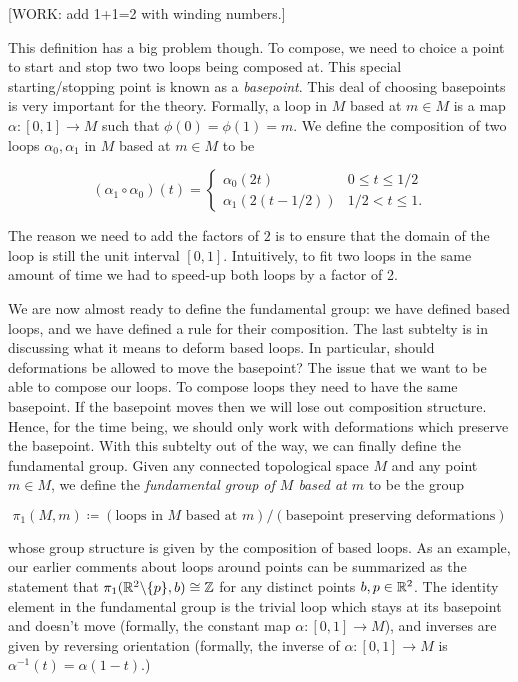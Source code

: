 [WORK: add 1+1=2 with winding numbers.]

This definition has a big problem though. To compose, we need to choice a point to start and stop two two loops being composed at. This special starting/stopping point is known as a \textit{basepoint}. This deal of choosing basepoints is very important for the theory. Formally, a loop in $M$ based at $m\in M$ is a map $\alpha:[0,1]\to M$ such that $\phi(0)=\phi(1)=m$. We define the composition of two loops $\alpha_0,\alpha_1$ in $M$ based at $m\in M$ to be

$$
(\alpha_1 \circ \alpha_0)(t)=
\begin{cases}
\alpha_0(2t) & 0\leq t \leq 1/2 \\
\alpha_1(2(t-1/2)) & 1/2 < t \leq 1.
\end{cases}$$

The reason we need to add the factors of $2$ is to ensure that the domain of the loop is still the unit interval $[0,1]$. Intuitively, to fit two loops in the same amount of time we had to speed-up both loops by a factor of 2.

We are now almost ready to define the fundamental group: we have defined based loops, and we have defined a rule for their composition. The last subtelty is in discussing what it means to deform based loops. In particular, should deformations be allowed to move the basepoint? The issue that we want to be able to compose our loops. To compose loops they need to have the same basepoint. If the basepoint moves then we will lose out composition structure. Hence, for the time being, we should only work with deformations which preserve the basepoint. With this subtelty out of the way, we can finally define the fundamental group. Given any connected topological space $M$ and any point $m\in M$, we define the \textit{fundamental group of $M$ based at $m$} to be the group

$$\pi_1(M,m)\coloneqq \left(\text{loops in $M$ based at $m$}\right)/\left(\text{basepoint preserving deformations}\right)$$

whose group structure is given by the composition of based loops. As an example, our earlier comments about loops around points can be summarized as the statement that $\pi_1(\mathbb{R}^2\backslash\{p\},b)\cong \mathbb{Z}$ for any distinct points $b,p\in \mathbb{R}^2$. The identity element in the fundamental group is the trivial loop which stays at its basepoint and doesn't move (formally, the constant map $\alpha:[0,1]\to M$), and inverses are given by reversing orientation (formally, the inverse of $\alpha:[0,1]\to M$ is $\alpha^{-1}(t)=\alpha(1-t)$.)

